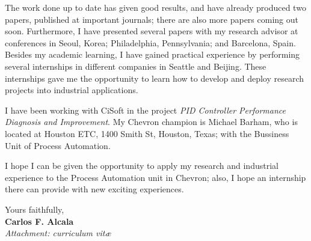 \documentclass[11pt]{article}
\begin{document}
The work done up to date has given good results, and have already produced two papers, published at important journals; there are also more papers coming out soon. Furthermore, I have presented several papers with my research advisor at conferences in Seoul, Korea; Philadelphia, Pennsylvania; and Barcelona, Spain. Besides my academic learning, I have gained practical experience by performing several internships in different companies in Seattle and Beijing. These internships gave me the opportunity to learn how to develop and deploy research projects into industrial applications.

I have been working with CiSoft in the project \emph{PID Controller Performance Diagnosis and Improvement}. My Chevron champion is Michael Barham, who is located at Houston ETC, 1400 Smith St, Houston, Texas; with the Bussiness Unit of Process Automation.

I hope I can be given the opportunity to apply my research and industrial experience to the Process Automation unit in Chevron; also, I hope an internship there can provide with new exciting experiences.

Yours faithfully,\\[2em] %
%
{\bfseries Carlos F. Alcala}\\
%
\vfill%
{\slshape Attachment: curriculum vit\ae{}}
\end{document}

